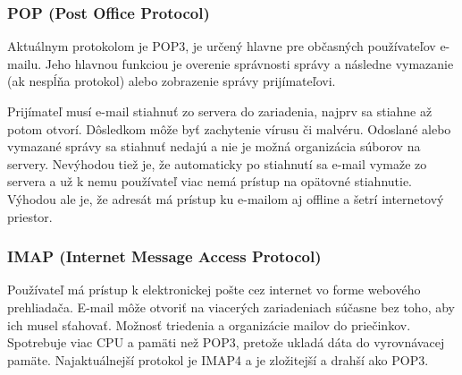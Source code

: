 \documentclass[10pt,twoside,slovak,a4paper]{article}
\begin{document}
\subsubsection{POP (Post Office Protocol)}
\begin{sloppypar}
Aktuálnym protokolom je POP3, je určený hlavne pre občasných používateľov e-mailu. Jeho hlavnou funkciou je overenie správnosti správy a následne vymazanie (ak nespĺňa protokol) alebo zobrazenie správy prijímateľovi.\par
\end{sloppypar}
\hspace{0.5cm}
Prijímateľ musí e-mail stiahnuť zo servera do zariadenia, najprv sa stiahne až potom otvorí. Dôsledkom môže byť zachytenie vírusu či malvéru. Odoslané alebo vymazané správy sa stiahnuť nedajú a nie je možná organizácia súborov na servery. Nevýhodou tiež je, že automaticky po stiahnutí sa e-mail vymaže zo servera a už k nemu používateľ viac nemá prístup na opätovné stiahnutie. Výhodou ale je, že adresát má prístup ku e-mailom aj offline a šetrí internetový priestor.\cite{GORALSKI,pakistan}
\raggedbottom
\subsubsection{IMAP (Internet Message Access Protocol)}

Používateľ má prístup k elektronickej pošte cez internet vo forme webového prehliadača. E-mail môže otvoriť na viacerých zariadeniach súčasne bez toho, aby ich musel sťahovať. Možnosť triedenia a organizácie mailov do priečinkov. Spotrebuje viac CPU a pamäti než POP3, pretože ukladá dáta do vyrovnávacej pamäte. Najaktuálnejší protokol je IMAP4 a je zložitejší a drahší ako POP3.\cite{pakistan}
\end{document}
